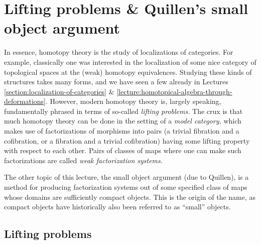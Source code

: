 

\section{Lifting problems \& Quillen's small object argument}\label{lecture:lifting-problems}

In essence, homotopy theory is the study of localizations of categories. For example, classically one was interested in the localization of some nice category of topological spaces
at the (weak) homotopy equivalences. Studying these kinds of structures takes many forms, and we have seen a few already in Lectures
\ref{section:localization-of-categories} \& \ref{lecture:homotopical-algebra-through-deformations}. However, modern homotopy theory is, largely speaking, fundamentally phrased in terms of
so-called \emph{lifting problems.} The crux is that much homotopy theory can be done in the setting of a \emph{model category,} which makes use of factorizations of morphisms into pairs
(a trivial fibration and a cofibration, or a fibration and a trivial cofibration) having some lifting property with respect to each other. Pairs of classes of maps where one can make such
factorizations are called \emph{weak factorization systems.}

The other topic of this lecture, the small object argument (due to Quillen), is a method for producing factorization systems out of some specified class of maps whose domains
are sufficiently compact objects. This is the origin of the name, as compact objects have historically also been referred to as ``small'' objects.

\subsection{Lifting problems}

